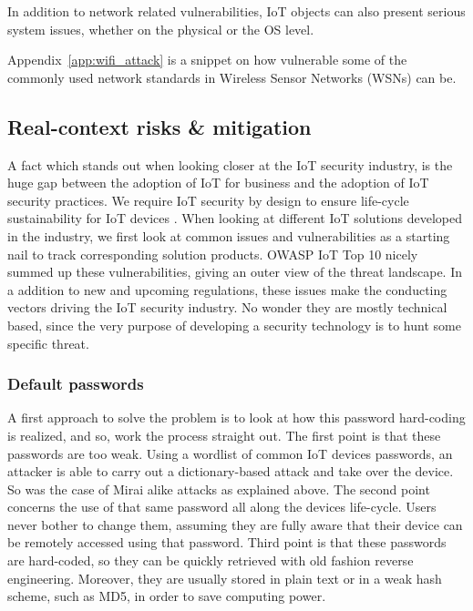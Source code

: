 In addition to network related vulnerabilities, IoT objects can also present serious system issues, whether on the physical or the OS level.


Appendix~\ref{app:wifi_attack} is a snippet on how vulnerable some of the commonly used network standards in Wireless Sensor Networks (WSNs) can be.

\subsection{Real-context risks \& mitigation}

A fact which stands out when looking closer at the IoT security industry, is the huge gap between the adoption of IoT for business and the adoption of IoT security practices. We require IoT security by design to ensure life-cycle sustainability for IoT devices \cite{thales2}.
When looking at different IoT solutions developed in the industry, we first look at common issues and vulnerabilities as a starting nail to track corresponding solution products. OWASP IoT Top 10 \cite{owasp-iot-10} nicely  summed up these vulnerabilities, giving an outer view of the threat landscape. In a addition to new and upcoming regulations, these issues make the conducting vectors driving the IoT security industry. No wonder they are mostly technical based, since the very purpose of developing a security technology is to hunt some specific threat.

\subsubsection{Default passwords}

A first approach to solve the problem is to look at how this password hard-coding is realized, and so, work the process straight out. The first point is that these passwords are too weak. Using a wordlist of common IoT devices passwords, an attacker is able to carry out a dictionary-based attack and take over the device. So was the case of Mirai alike attacks as explained above. The second point concerns the use of that same password all along the devices life-cycle. Users never bother to change them, assuming they are fully aware that their device can be remotely accessed using that password. Third point is that these passwords are hard-coded, so they can be quickly retrieved with old fashion reverse engineering. Moreover, they are usually stored in plain text or in a weak hash scheme, such as MD5, in order to save computing power.

